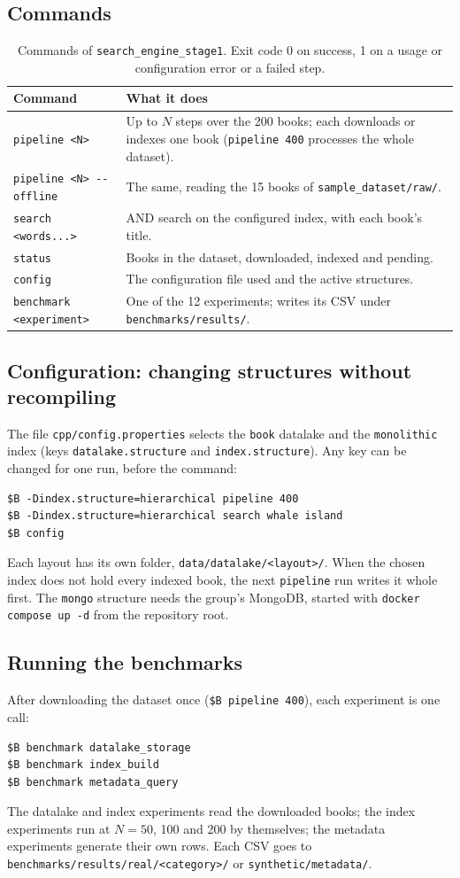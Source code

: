 \documentclass[11pt,a4paper]{article}
\newcommand{\code}[1]{\texttt{#1}}
\begin{document}
\subsection{Commands}
\begin{table}[H]
\centering\small
\begin{tabularx}{\linewidth}{@{}L{4.6cm} Y@{}}
\toprule
Command & What it does \\
\midrule
\code{pipeline <N>} & Up to $N$ steps over the 200 books; each downloads or indexes one book (\code{pipeline 400} processes the whole dataset). \\
\code{pipeline <N> -{}-offline} & The same, reading the 15 books of \code{sample\_dataset/raw/}. \\
\code{search <words...>} & AND search on the configured index, with each book's title. \\
\code{status} & Books in the dataset, downloaded, indexed and pending. \\
\code{config} & The configuration file used and the active structures. \\
\code{benchmark <experiment>} & One of the 12 experiments; writes its CSV under \code{benchmarks/results/}. \\
\bottomrule
\end{tabularx}
\caption{Commands of \code{search\_engine\_stage1}. Exit code 0 on success, 1 on a usage or configuration error or a failed step.}
\end{table}

\subsection{Configuration: changing structures without recompiling}
The file \code{cpp/config.properties} selects the \code{book} datalake and the \code{monolithic}
index (keys \code{datalake.structure} and \code{index.structure}). Any key can be changed for one
run, before the command:
\begin{lstlisting}[style=shell]
$B -Dindex.structure=hierarchical pipeline 400
$B -Dindex.structure=hierarchical search whale island
$B config
\end{lstlisting}
Each layout has its own folder, \code{data/datalake/<layout>/}. When the chosen index does not hold
every indexed book, the next \code{pipeline} run writes it whole first. The \code{mongo} structure needs
the group's MongoDB, started with \code{docker compose up -d} from the repository root.

\subsection{Running the benchmarks}
After downloading the dataset once (\code{\$B pipeline 400}), each experiment is one call:
\begin{lstlisting}[style=shell]
$B benchmark datalake_storage
$B benchmark index_build
$B benchmark metadata_query
\end{lstlisting}
The datalake and index experiments read the downloaded books; the index experiments run at
$N = 50$, 100 and 200 by themselves; the metadata experiments generate their own rows. Each CSV goes to
\code{benchmarks/results/real/<category>/} or \code{synthetic/metadata/}.
\end{document}
